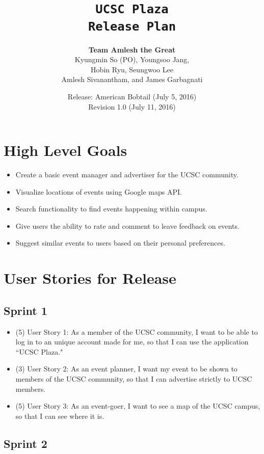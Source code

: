 \documentclass[10pt]{article}
\title{\color{primary}\texttt{UCSC Plaza \\ Release Plan}}
\author{{\color{secondary}\textbf{Team Amlesh the Great}} \\ Kyungmin So (PO), Youngsoo Jang, \\ Hobin Ryu, Seungwoo Lee \\ Amlesh Sivanantham, and James Garbagnati }
\date{Release: American Bobtail (July 5, 2016) \\ Revision 1.0 (July 11, 2016)}
\newcommand{\fancysecX}[2] {{\color{primary}\section*{#1} \label{sec:#2}}}
\newcommand{\fancysubX}[2] {{\color{primary}\subsection*{#1} \label{sec:#2}}}
\begin{document}
\maketitle

\fancysecX{High Level Goals}{goals}

    \begin{itemize}
        \item Create a basic event manager and advertiser for the UCSC community.
        \item Visualize locations of events using Google maps API.
        \item Search functionality to find events happening within campus.
        \item Give users the ability to rate and comment to leave feedback on events.
        \item Suggest similar events to users based on their personal preferences.
    \end{itemize}
    
\fancysecX{User Stories for Release}{stories}
    
    \fancysubX{Sprint 1}{sprint1}
     
        \begin{itemize}
            \item (5) User Story 1: As a member of the UCSC community, I want to be able to log in to an unique account made for me, so that I can use the application ``UCSC Plaza."
            \item (3) User Story 2: As an event planner, I want my event to be shown to members of the UCSC community, so that I can advertise strictly to UCSC members.
            \item (5) User Story 3: As an event-goer, I want to see a map of the UCSC campus, so that I can see where it is.
        \end{itemize}
     
    \fancysubX{Sprint 2}{sprint2}
        
\end{document}
